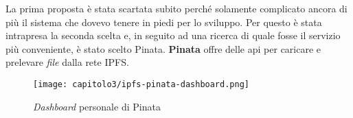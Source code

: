 La prima proposta è stata scartata subito perché solamente complicato ancora di più il sistema che dovevo tenere in piedi per lo sviluppo. Per questo è stata intrapresa la seconda scelta e, in seguito ad una ricerca di quale fosse il servizio più conveniente, è stato scelto Pinata. \textbf{Pinata} offre delle \gls{api} per caricare e prelevare \textit{file} dalla rete IPFS.

\clearpage 
\begin{figure}[h!]
  \centering
  \texttt{[image: capitolo3/ipfs-pinata-dashboard.png]}
  \caption{\textit{Dashboard} personale di Pinata}
\end{figure}
